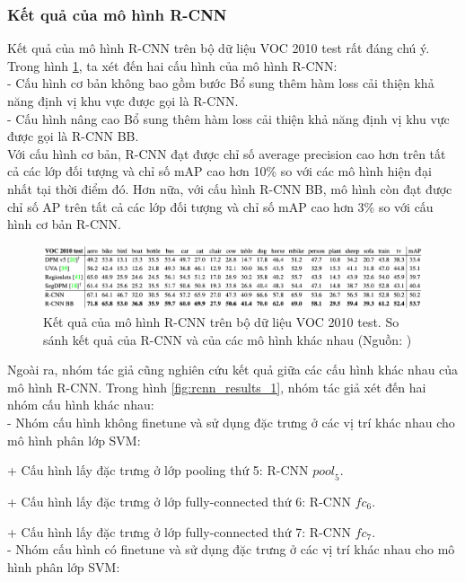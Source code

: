{    \subsubsection*{Kết quả của mô hình R-CNN}
    Kết quả của mô hình R-CNN trên bộ dữ liệu VOC 2010 test rất đáng chú ý.
    Trong hình \ref{fig:rcnn_results_3}, ta xét đến hai cấu hình của mô hình R-CNN: \\
    - Cấu hình cơ bản không bao gồm bước Bổ sung thêm hàm loss cải thiện khả năng định vị khu vực được gọi là R-CNN. \\
    - Cấu hình nâng cao Bổ sung thêm hàm loss cải thiện khả năng định vị khu vực được gọi là R-CNN BB. \\
    Với cấu hình cơ bản, R-CNN đạt được chỉ số average precision cao hơn trên tất cả các lớp đối tượng  và chỉ số mAP cao hơn 10\% so với các mô hình hiện đại nhất tại thời điểm đó.
    Hơn nữa, với cấu hình R-CNN BB, mô hình còn đạt được chỉ số AP trên tất cả các lớp đối tượng  và chỉ số mAP cao hơn 3\% so với cấu hình cơ bản R-CNN.
    \begin{figure}[H]
        \centering
        \includegraphics[width=15cm] {images/rcnn_results_3}
        \caption{Kết quả của mô hình R-CNN trên bộ dữ liệu VOC 2010 test. So sánh kết quả của R-CNN và của các mô hình khác nhau (Nguồn: \cite{girshick2014rich})}
        \label{fig:rcnn_results_3}
    \end{figure}
    \noindent
    Ngoài ra, nhóm tác giả cũng nghiên cứu kết quả giữa các cấu hình khác nhau của mô hình R-CNN.
    Trong hình \ref{fig:rcnn_results_1}, nhóm tác giả xét đến hai nhóm cấu hình khác nhau: \\
    - Nhóm cấu hình không finetune và sử dụng đặc trưng ở các vị trí khác nhau cho mô hình phân lớp SVM: \par
    + Cấu hình lấy đặc trưng ở lớp pooling thứ 5: R-CNN ${pool}_{5}$. \par
    + Cấu hình lấy đặc trưng ở lớp fully-connected thứ 6: R-CNN ${fc}_{6}$. \par
    + Cấu hình lấy đặc trưng ở lớp fully-connected thứ 7: R-CNN ${fc}_{7}$. \\
    - Nhóm cấu hình có finetune và sử dụng đặc trưng ở các vị trí khác nhau cho mô hình phân lớp SVM: \par
}
